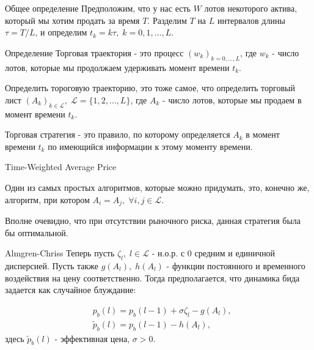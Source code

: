 \documentclass[aspectratio=169]{beamer}
\begin{document}
    \begin{frame}{Общее определение}
        Предположим, что у нас есть $W$ лотов некоторого актива, который мы хотим продать за время $T$. Разделим $T$ на $L$ интервалов длины $\tau = T/L$, и определим $t_k = k\tau, \; k = 0,1, \ldots, L$.
    
        \begin{block}{Определение}
            Торговая траектория - это процесс $(w_k)_{k = 0, \ldots, L}$, где $w_k$ - число лотов, которые мы продолжаем удерживать момент времени $t_k$. 
            
            Определить тороговую траекторию, это тоже самое, что определить торговый лист $(A_k)_{k \in \mathcal L}, \; \mathcal L = \{1,2,\ldots, L \}$, где $A_k$ - число лотов, которые мы продаем в момент времени $t_k$. 
    
            Торговая стратегия - это правило, по которому определяется $A_k$ в момент времени $t_k$ по имеющийся информации к этому моменту времени. 
        \end{block}
    
    \end{frame}

    
    \begin{frame}{Time-Weighted Average Price}

        Один из самых простых алгоритмов, которые можно придумать, это, конечно же, алгоритм, при котором $A_i = A_j, \; \forall i, j \in \mathcal L$. 
    
        Вполне очевидно, что при отсутствии рыночного риска, данная стратегия была бы оптимальной.
        

    \end{frame}

    \begin{frame}{Almgren-Chriss}
        Теперь пусть $\zeta_l, \; l \in \mathcal L$ - н.о.р. с 0 средним и единичной дисперсией. Пусть также $g(A_l), \; h(A_l)$ - функции постоянного и временного воздействия на цену соответственно. Тогда предполагается, что динамика бида задается как случайное блуждание:
        
        \begin{align*}
            &p_b(l) = p_b(l - 1) + \sigma \zeta_l - g(A_l), \\
            &\tilde p_b(l) = p_b(l - 1) - h(A_l),
        \end{align*}
        здесь $\tilde p_b(l)$ - эффективная цена, $\sigma > 0$.

    \end{frame}
\end{document}
